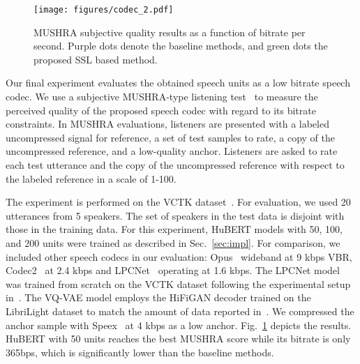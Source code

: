 \begin{figure}[t!]
\centering
\texttt{[image: figures/codec\_2.pdf]}
\caption{MUSHRA subjective quality results as a function of bitrate per second. Purple dots denote the baseline methods, and green dots the proposed SSL based method.} 
\label{fig:codec}
\vspace{-0.5cm}
\end{figure}

{}
Our final experiment evaluates the obtained speech units as a low bitrate speech codec. 
We use a subjective MUSHRA-type listening test~\cite{series2014method} to measure the perceived quality of the proposed speech codec with regard to its bitrate constraints. In MUSHRA evaluations, listeners are presented with a labeled uncompressed signal for reference, a set of test samples to rate, a copy of the uncompressed reference, and a low-quality anchor. Listeners are asked to rate each test utterance and the copy of the uncompressed reference with respect to the labeled reference in a scale of 1-100.

The experiment is performed on the VCTK dataset~\cite{vctk}. For evaluation, we used 20 utterances from 5 speakers. The set of speakers in the test data is disjoint with those in the training data. For this experiment, HuBERT models with 50, 100, and 200 units were trained as described in Sec.~\ref{sec:impl}. For comparison, we included other speech codecs in our evaluation: Opus~\cite{valin2012definition} wideband at 9 kbps VBR, Codec2~\cite{rowe2011codec} at 2.4 kbps and LPCNet~\cite{valin2019real} operating at 1.6 kbps. The LPCNet model was trained from scratch on the VCTK dataset following the experimental setup in~\cite{valin2019real}. The VQ-VAE model employs the HiFiGAN decoder trained on the LibriLight dataset to match the amount of data reported in~\cite{garbacea2019low}. We compressed the anchor sample with Speex~\cite{valin2016speex} at 4 kbps as a low anchor. Fig.~\ref{fig:codec} depicts the results. HuBERT with 50 units reaches the best MUSHRA score while its bitrate is only 365bps, which is significantly lower than the baseline methods.